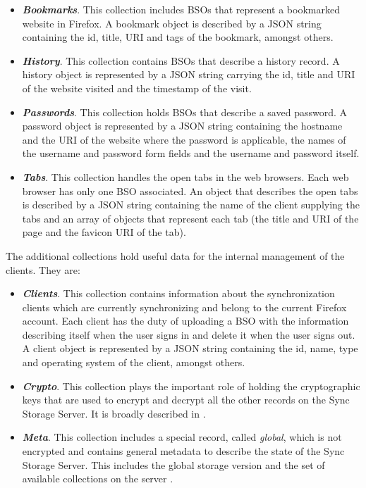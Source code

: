 \begin{itemize}
  \item \textbf{\textit{Bookmarks}}. This collection includes BSOs that represent a bookmarked website in Firefox. A bookmark object is described by a JSON string containing the id, title, URI and tags of the bookmark, amongst others.

  \item \textbf{\textit{History}}. This collection contains BSOs that describe a history record. A history object is represented by a JSON string carrying the id, title and URI of the website visited and the timestamp of the visit.

  \item \textbf{\textit{Passwords}}. This collection holds BSOs that describe a saved password. A password object is represented by a JSON string containing the hostname and the URI of the website where the password is applicable, the names of the username and password form fields and the username and password itself.

  \item \textbf{\textit{Tabs}}. This collection handles the open tabs in the web browsers. Each web browser has only one BSO associated. An object that describes the open tabs is described by a JSON string containing the name of the client supplying the tabs and an array of objects that represent each tab (the title and URI of the page and the favicon URI of the tab).
\end{itemize}

The additional collections hold useful data for the internal management of the clients. They are:

\begin{itemize}
  \item \textbf{\textit{Clients}}. This collection contains information about the synchronization clients which are currently synchronizing and belong to the current Firefox account. Each client has the duty of uploading a BSO with the information describing itself when the user signs in and delete it when the user signs out. A client object is represented by a JSON string containing the id, name, type and operating system of the client, amongst others.

  \item \textbf{\textit{Crypto}}. This collection plays the important role of holding the cryptographic keys that are used to encrypt and decrypt all the other records on the Sync Storage Server. It is broadly described in .

  \item \textbf{\textit{Meta}}. This collection includes a special record, called \textit{global}, which is not encrypted and contains general metadata to describe the state of the Sync Storage Server. This includes the global storage version and the set of available collections on the server \cite{sync-client-docs}.
\end{itemize}

